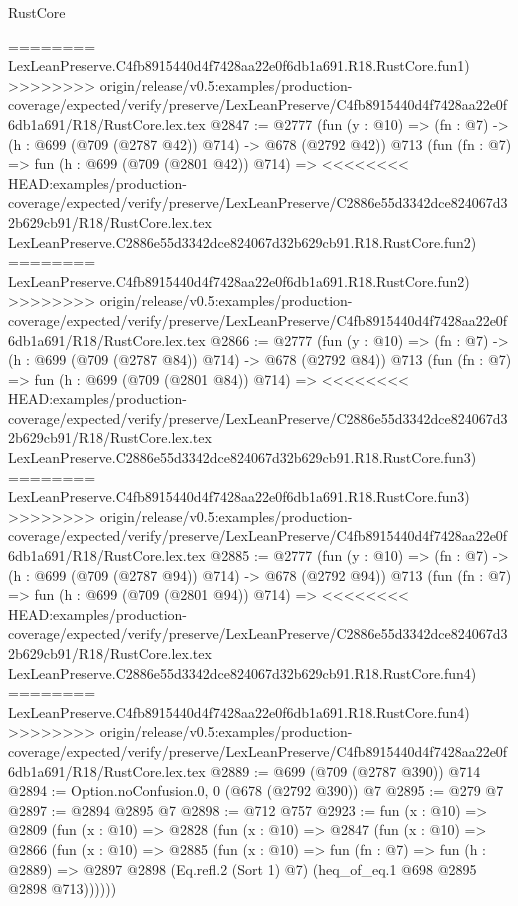 \begin{lexlean}{RustCore}
\begin{coremodule}
{\begin{coremodule}
{{{{{{{{{========
    LexLeanPreserve.C4fb8915440d4f7428aa22e0f6db1a691.R18.RustCore.fun1)
>>>>>>>> origin/release/v0.5:examples/production-coverage/expected/verify/preserve/LexLeanPreserve/C4fb8915440d4f7428aa22e0f6db1a691/R18/RustCore.lex.tex
@2847 := @2777
    (fun (y : @10) => (fn : @7) -> (h : @699 (@709 (@2787 @42)) @714) -> @678 (@2792 @42))
    @713
    (fun (fn : @7) =>
    fun (h : @699 (@709 (@2801 @42)) @714) =>
<<<<<<<< HEAD:examples/production-coverage/expected/verify/preserve/LexLeanPreserve/C2886e55d3342dce824067d32b629cb91/R18/RustCore.lex.tex
    LexLeanPreserve.C2886e55d3342dce824067d32b629cb91.R18.RustCore.fun2)
========
    LexLeanPreserve.C4fb8915440d4f7428aa22e0f6db1a691.R18.RustCore.fun2)
>>>>>>>> origin/release/v0.5:examples/production-coverage/expected/verify/preserve/LexLeanPreserve/C4fb8915440d4f7428aa22e0f6db1a691/R18/RustCore.lex.tex
@2866 := @2777
    (fun (y : @10) => (fn : @7) -> (h : @699 (@709 (@2787 @84)) @714) -> @678 (@2792 @84))
    @713
    (fun (fn : @7) =>
    fun (h : @699 (@709 (@2801 @84)) @714) =>
<<<<<<<< HEAD:examples/production-coverage/expected/verify/preserve/LexLeanPreserve/C2886e55d3342dce824067d32b629cb91/R18/RustCore.lex.tex
    LexLeanPreserve.C2886e55d3342dce824067d32b629cb91.R18.RustCore.fun3)
========
    LexLeanPreserve.C4fb8915440d4f7428aa22e0f6db1a691.R18.RustCore.fun3)
>>>>>>>> origin/release/v0.5:examples/production-coverage/expected/verify/preserve/LexLeanPreserve/C4fb8915440d4f7428aa22e0f6db1a691/R18/RustCore.lex.tex
@2885 := @2777
    (fun (y : @10) => (fn : @7) -> (h : @699 (@709 (@2787 @94)) @714) -> @678 (@2792 @94))
    @713
    (fun (fn : @7) =>
    fun (h : @699 (@709 (@2801 @94)) @714) =>
<<<<<<<< HEAD:examples/production-coverage/expected/verify/preserve/LexLeanPreserve/C2886e55d3342dce824067d32b629cb91/R18/RustCore.lex.tex
    LexLeanPreserve.C2886e55d3342dce824067d32b629cb91.R18.RustCore.fun4)
========
    LexLeanPreserve.C4fb8915440d4f7428aa22e0f6db1a691.R18.RustCore.fun4)
>>>>>>>> origin/release/v0.5:examples/production-coverage/expected/verify/preserve/LexLeanPreserve/C4fb8915440d4f7428aa22e0f6db1a691/R18/RustCore.lex.tex
@2889 := @699 (@709 (@2787 @390)) @714
@2894 := Option.noConfusion.{0, 0} (@678 (@2792 @390)) @7
@2895 := @279 @7
@2897 := @2894 @2895 @7
@2898 := @712 @757
@2923 := fun (x : @10) =>
  @2809
    (fun (x : @10) =>
    @2828
      (fun (x : @10) =>
      @2847
        (fun (x : @10) =>
        @2866
          (fun (x : @10) =>
          @2885
            (fun (x : @10) =>
            fun (fn : @7) =>
            fun (h : @2889) =>
            @2897 @2898 (Eq.refl.{2} (Sort 1) @7) (heq_of_eq.{1} @698 @2895 @2898 @713))))))
}}}}}}}}}
\end{coremodule}}
\end{coremodule}
\end{lexlean}

